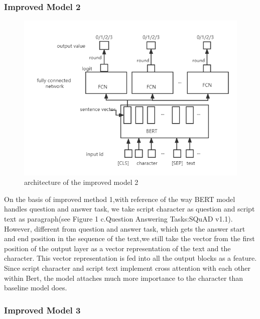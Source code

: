 \documentclass[12pt,twocolumn,letterpaper]{article}
\begin{document}
\subsubsection{Improved Model 2}
\begin{figure}
\begin{center}
\includegraphics[scale=0.5]{Method3.png}
\end{center}
   \caption{architecture of the improved model 2}
\label{fig:short}
\end{figure}

 On the basis of improved method 1,with reference of the way BERT model handles question and answer task, we take script character as question and script text as paragraph(see Figure 1 c.Question Answering Tasks:SQuAD v1.1). However, different from question and answer task, which gets the answer start and end position in the sequence of the text,we still take the vector from the first position of the output layer as a vector representation of the text and the character. This vector representation is fed into all the output blocks as a feature. Since script character and script text implement cross attention with each other within Bert, the model attaches much more importance to the character than baseline model does.  
\subsubsection{Improved Model 3}
\end{document}
